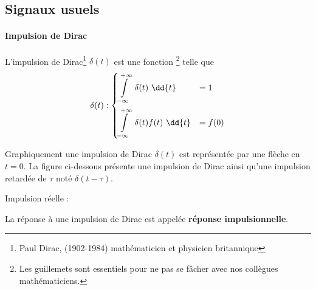 \subsection{Signaux usuels}
\paragraph{Impulsion de Dirac}

L'impulsion de Dirac\footnote{Paul Dirac, (1902-1984) mathématicien et 
physicien britannique} $\delta(t)$ est une \og fonction\fg 
\footnote{Les guillemets sont essentiels pour ne pas se fâcher avec nos collègues mathématiciens.} telle que
\begin{align*}
\delta(t) : 
\begin{dcases}
	\int\limits_{-\infty}^{+\infty}	 \delta(t)\,\,\dd{t}&=1   \\
\int\limits_{-\infty}^{+\infty}  \delta(t)f(t)\,\,\dd{t}&=f(0)	
\end{dcases}
\end{align*}

Graphiquement une impulsion de Dirac $\delta(t)$ est 
représentée par une flèche en $t=0$. La figure ci-dessous présente 
une impulsion de Dirac ainsi qu'une 
impulsion retardée de $\tau$ noté $\delta(t-\tau)$.

\begin{figure}[!h]
\begin{center}

\end{center}
\caption{\label{fig-dirac}}
\end{figure}

Impulsion réelle :

\begin{figure}[!h]
\begin{center}

    \caption{\label{fig-dirac2}}
\end{center}
\end{figure}

La réponse à une impulsion de Dirac est appelée \textbf{réponse impulsionnelle}.

